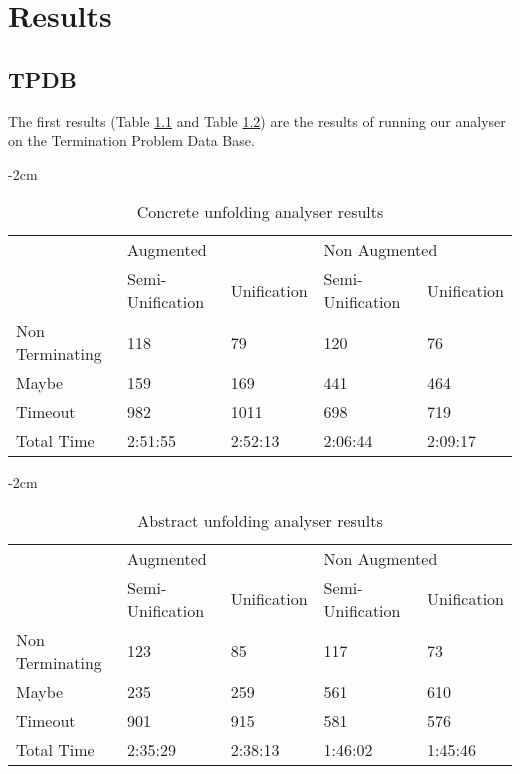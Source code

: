 \chapter{Results}\label{resultsexperiments}
\section{TPDB}
The first results (Table \ref{tab:result:concrete} and Table \ref{tab:result:abstract}) are the results of running our analyser on the Termination Problem Data Base\cite{TermPortal}. 
\begin{table}[ht]
    \centering
    \addtolength{\leftskip} {-2cm}
    \addtolength{\rightskip}{-2cm}

    \begin{tabular}{|l|l|l|l|l|}
    \cline{2-5} 
    \multicolumn{1}{c|}{} & \multicolumn{2}{l|}{Augmented} & \multicolumn{2}{l|}{Non Augmented} \\ \cline{2-5} 
    \multicolumn{1}{c|}{} & Semi-Unification & Unification & Semi-Unification & Unification \\ \hline
    Non Terminating & 118 & 79 & 120 & 76 \\ \hline
    Maybe & 159 & 169 & 441 & 464\\ \hline
    Timeout & 982 & 1011 & 698 & 719 \\ \hline
    Total Time & 2:51:55 & 2:52:13 & 2:06:44 & 2:09:17 \\ \hline
    \end{tabular}
    \caption{Concrete unfolding analyser results}
\label{tab:result:concrete}

\end{table}
\begin{table}[ht]
    \centering
    \addtolength{\leftskip} {-2cm}
    \addtolength{\rightskip}{-2cm}

    \begin{tabular}{|l|l|l|l|l|}
    \cline{2-5} 
    \multicolumn{1}{c|}{} & \multicolumn{2}{l|}{Augmented} & \multicolumn{2}{l|}{Non Augmented} \\ \cline{2-5} 
    \multicolumn{1}{c|}{} & Semi-Unification & Unification & Semi-Unification & Unification \\ \hline
    Non Terminating & 123 & 85 & 117 & 73 \\ \hline
    Maybe & 235 & 259 & 561 & 610 \\ \hline
    Timeout & 901 & 915 & 581 & 576 \\ \hline
    Total Time & 2:35:29 & 2:38:13 & 1:46:02 & 1:45:46 \\ \hline
    \end{tabular}
    \caption{Abstract unfolding analyser results}
    \label{tab:result:abstract}
\end{table}

